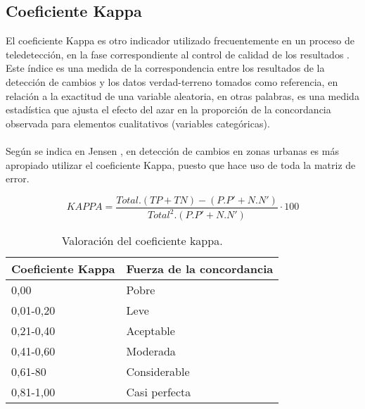\subsection{Coeficiente Kappa}\label{sec:kappa}
El coeficiente Kappa es otro indicador utilizado frecuentemente en un proceso de teledetecci\'on, en la fase correspondiente al control de calidad de los resultados \cite{chuvieco1998factor}. Este \'indice es una medida de la correspondencia entre los resultados de la detecci\'on de cambios y los datos verdad-terreno tomados como referencia, en relaci\'on a la exactitud de una variable aleatoria, en otras palabras, es una medida estad\'istica que ajusta el efecto del azar en la proporci\'on de la concordancia observada para elementos cualitativos (variables categ\'oricas).\\~\\
Seg\'un se indica en Jensen \cite{jensen1981urban}, en detecci\'on de cambios en zonas urbanas es m\'as apropiado utilizar el coeficiente Kappa, puesto que hace uso de toda la matriz de error.

		\begin{equation}
		KAPPA=\dfrac{Total.(TP+TN)-(P.P'+N.N')}{Total^{2}.(P.P'+N.N')}\cdot100
		\end{equation}
		
		\begin{table}[H]
			\centering
			\begin{tabular}{|l|l|}
				\hline
				\rowcolor[HTML]{EFEFEF} 
				\textbf{Coeficiente Kappa} & \textbf{Fuerza de la concordancia} \\ \hline
				0,00                       & Pobre                              \\ \hline
				0,01-0,20                  & Leve                               \\ \hline
				0,21-0,40                  & Aceptable                          \\ \hline
				0,41-0,60                  & Moderada                           \\ \hline
				0,61-80                    & Considerable                       \\ \hline
				0,81-1,00                  & Casi perfecta                      \\ \hline
			\end{tabular}
						\caption{Valoración del coeficiente kappa\cite{landis1977measurement}.}
						\label{t:kappaTable}
		\end{table}
		


